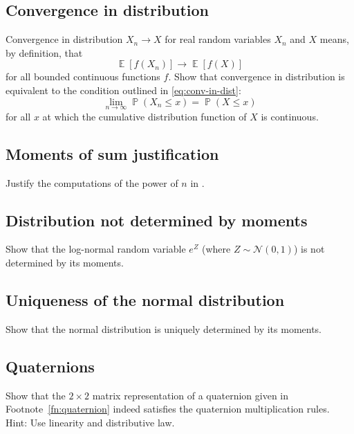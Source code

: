 \documentclass[letterpaper,11pt,oneside,reqno]{article}
\numberwithin{equation}{section}
\theoremstyle{definition}
\begin{document}
\subsection{Convergence in distribution}
\label{prob:conv-in-dist-problem}

Convergence in distribution $X_n\to X$
for real random variables $X_n$ and $X$ means, by definition,
that
\begin{equation*}
	\operatorname{\mathbb{E}}[f(X_n)] \to \operatorname{\mathbb{E}}[f(X)]
\end{equation*}
for all bounded continuous functions $f$.
Show that convergence in distribution
is equivalent to the condition outlined in \eqref{eq:conv-in-dist}:
\begin{equation*}
	\lim_{n \to \infty} \operatorname{\mathbb{P}}(X_n \leq x) = \operatorname{\mathbb{P}}(X \leq x)
\end{equation*}
for all $x$ at which the cumulative distribution function of $X$ is continuous.

\subsection{Moments of sum justification}

Justify the computations of the power of $n$ in
.

\subsection{Distribution not determined by moments}

Show that the log-normal random variable
$e^{Z}$ (where $Z\sim \mathcal{N}(0,1)$)
is not determined by its moments.

\subsection{Uniqueness of the normal distribution}
\label{prob:uniqueness-normal}

Show that the normal distribution is uniquely determined by its moments.

\subsection{Quaternions}

Show that the $2\times 2$ matrix representation of a quaternion
given in Footnote~\ref{fn:quaternion}
indeed satisfies the quaternion multiplication rules.
Hint: Use linearity and distributive law.
\end{document}
